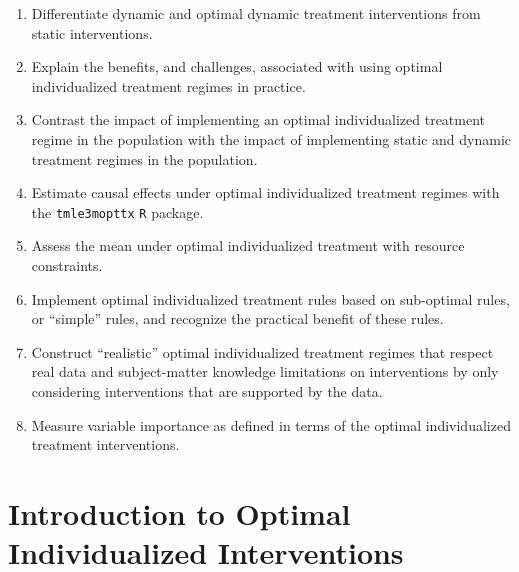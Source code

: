 \documentclass[12pt, krantz2,]{krantz}
\newcommand{\passthrough}[1]{#1}
\providecommand{\tightlist}{%
  \setlength{\itemsep}{0pt}\setlength{\parskip}{0pt}}
\theoremstyle{definition}
\theoremstyle{definition}
\theoremstyle{definition}
\newcommand{\1}{\mathbbm{1}}
\begin{document}
\begin{enumerate}
\def\labelenumi{\arabic{enumi}.}
\tightlist
\item
  Differentiate dynamic and optimal dynamic treatment interventions from static
  interventions.
\item
  Explain the benefits, and challenges, associated with using optimal
  individualized treatment regimes in practice.
\item
  Contrast the impact of implementing an optimal individualized treatment
  regime in the population with the impact of implementing static and dynamic
  treatment regimes in the population.
\item
  Estimate causal effects under optimal individualized treatment regimes with
  the \passthrough{\lstinline!tmle3mopttx!} \passthrough{\lstinline!R!} package.
\item
  Assess the mean under optimal individualized treatment with resource
  constraints.
\item
  Implement optimal individualized treatment rules based on sub-optimal
  rules, or ``simple'' rules, and recognize the practical benefit of these rules.
\item
  Construct ``realistic'' optimal individualized treatment regimes that respect
  real data and subject-matter knowledge limitations on interventions by
  only considering interventions that are supported by the data.
\item
  Measure variable importance as defined in terms of the optimal individualized
  treatment interventions.
\end{enumerate}

\hypertarget{introduction-to-optimal-individualized-interventions}{%
\section{Introduction to Optimal Individualized Interventions}\label{introduction-to-optimal-individualized-interventions}}
\end{document}
